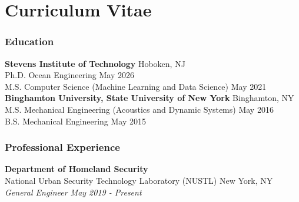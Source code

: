 \chapter*{Curriculum Vitae}
\vfill

\begin{singlespace}
\footnotesize %
\setlength{\parindent}{0pt} %
\setlength{\parskip}{0pt}   %
\setlength{\itemsep}{0pt}   %
\setlength{\parsep}{0pt}    %
\setlength{\topsep}{0pt}    %
\setlength{\partopsep}{0pt} %



\subsection*{Education}
\textbf{Stevens Institute of Technology} \hfill Hoboken, NJ \\
Ph.D. Ocean Engineering \hfill May 2026 \\
M.S. Computer Science (Machine Learning and Data Science) \hfill May 2021 \\

\textbf{Binghamton University, State University of New York} \hfill Binghamton, NY \\
M.S. Mechanical Engineering (Acoustics and Dynamic Systems) \hfill May 2016 \\
B.S. Mechanical Engineering \hfill May 2015 \\

\subsection*{Professional Experience}

\textbf{Department of Homeland Security}\\
National Urban Security Technology Laboratory (NUSTL) \hfill New York, NY \\
\textit{General Engineer \hfill May 2019 - Present} \\


\end{singlespace}
